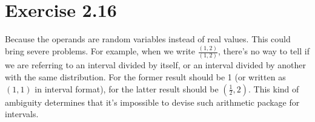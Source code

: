 \documentclass[../main.tex]{subfiles}
\begin{document}
\section{Exercise 2.16}

Because the operands are random variables instead of real values. This
 could bring severe problems. For example, when we write $\frac{(1, 2)}{(1, 2)}$,
 there's no way to tell if we are referring to an interval divided by itself,
 or an interval divided by another with the same distribution. For the former
 result should be 1 (or written as $(1, 1)$ in interval format), for the latter
 result should be $(\frac{1}{2}, 2)$. This kind of ambiguity determines that
 it's impossible to devise such arithmetic package for intervals.
\end{document}
